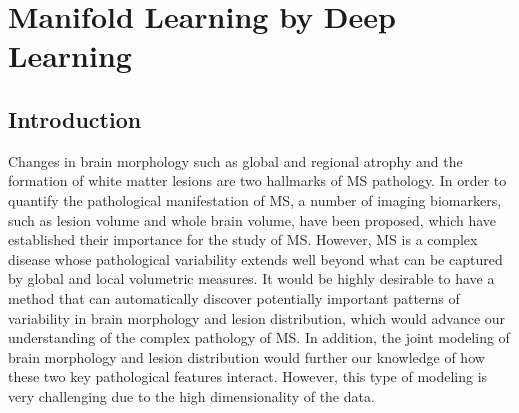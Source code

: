 \chapter{Manifold Learning by Deep Learning}
\label{sec:manifold}

\section{Introduction}

Changes in brain morphology such as global and regional atrophy and the
formation of white matter lesions are two hallmarks of MS pathology. In order to
quantify the pathological manifestation of MS, a number of imaging biomarkers,
such as lesion volume and whole brain volume, have been proposed, which have
established their importance for the study of MS. However, MS is a complex
disease whose pathological variability extends well beyond what can be captured
by global and local volumetric measures. It would be highly desirable to have a
method that can automatically discover potentially important patterns of
variability in brain morphology and lesion distribution, which would advance our
understanding of the complex pathology of MS. In addition, the joint modeling of
brain morphology and lesion distribution would further our knowledge of how
these two key pathological features interact. However, this type of modeling is
very challenging due to the high dimensionality of the data.


